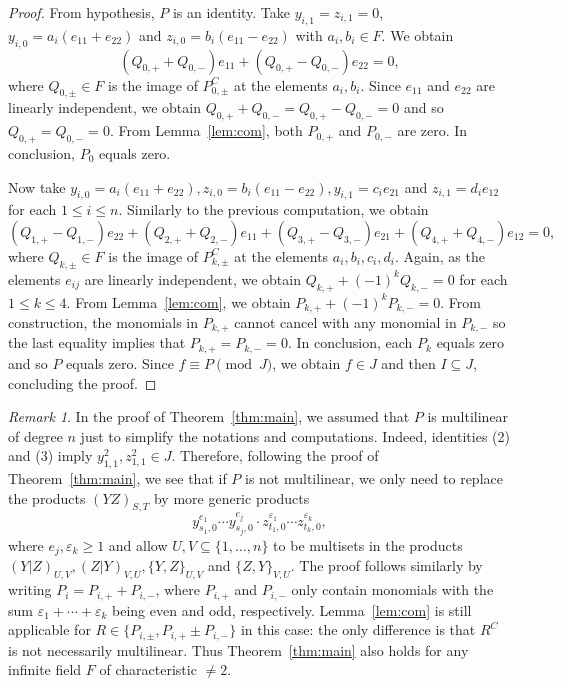 \documentclass[11pt]{amsart}
\theoremstyle{definition}
\theoremstyle{remark}
\newtheorem{remark}[theorem]{Remark}
\begin{document}
\begin{proof}
		From hypothesis, $P$ is an identity. Take $y_{i, 1}= z_{i, 1}=0$, $y_{i, 0}=a_i(e_{11}+e_{22})$ and $z_{i, 0}=b_i (e_{11}-e_{22})$ with $a_i, b_i\in F$. We obtain
		$$(Q_{0, +}+Q_{0, -})e_{1 1}+(Q_{0, +}-Q_{0, -})e_{2 2}=0,$$
		where $Q_{0, \pm}\in F$ is the image of $P_{0, \pm}^C$ at the elements $a_i, b_i$. Since $e_{11}$ and $e_{22}$ are linearly independent, we obtain $Q_{0, +}+Q_{0, -}=Q_{0, +}-Q_{0, -}=0$ and so $Q_{0, +}=Q_{0, -}=0$. From Lemma~\ref{lem:com}, both $P_{0, +}$ and $P_{0, -}$ are zero. In conclusion, $P_0$ equals zero.
		
		Now take $y_{i, 0}=a_i(e_{11}+e_{22}), z_{i, 0}=b_i(e_{11}-e_{22}), y_{i, 1}=c_i e_{21}$ and $z_{i, 1}=d_i e_{12}$ for each $1\le i\le n$.
		Similarly to the previous computation, we obtain 
		$$(Q_{1, +}-Q_{1, -})e_{22}+(Q_{2, +}+Q_{2, -})e_{11}+(Q_{3, +}-Q_{3, -})e_{21}+(Q_{4, +}+Q_{4, -}) e_{12}=0,$$
		where $Q_{k, \pm}\in F$ is the image of $P_{k, \pm}^C$ at the elements $a_i, b_i, c_i, d_i$. 
		Again, as the elements $e_{ij}$ are linearly independent, we obtain $Q_{k, +}+(-1)^kQ_{k, -}=0$ for each $1\le k\le 4$. From Lemma~\ref{lem:com}, we obtain $P_{k, +}+(-1)^kP_{k, -}=0$. From construction, the monomials in $P_{k, +}$ cannot cancel with any monomial in  $P_{k, -}$ so the last equality implies that $P_{k, +}=P_{k, -}=0$. In conclusion, each $P_k$ equals zero and so $P$ equals zero. Since $f\equiv P\pmod J$, we obtain $f\in J$ and then $I\subseteq J$, concluding the proof.
	\end{proof}
	
	
	\begin{remark}\label{rem:homo}
		In the proof of Theorem~\ref{thm:main}, we assumed that $P$ is multilinear of degree $n$ just to simplify the notations and computations. Indeed, identities (2) and (3) imply $y_{1, 1}^2, z_{1, 1}^2\in J$. Therefore, following the proof of Theorem~\ref{thm:main}, we see that if $P$ is not multilinear, we only need to replace the products
		$(YZ)_{S, T}$ by more generic products 
		$$y_{s_1, 0}^{e_1}\cdots y_{s_j, 0}^{e_j}\cdot z_{t_1, 0}^{\varepsilon_1}\cdots z_{t_k, 0}^{\varepsilon_k},$$
		where $e_j, \varepsilon_k\ge 1$ and allow $U, V\subseteq\{1, \ldots, n\}$ to be multisets in the products $(Y|Z)_{U, V}, (Z|Y)_{V, U}, \{Y, Z\}_{U, V}$ and $\{Z, Y\}_{V, U}$. The proof follows similarly by writing $P_i=P_{i, +}+P_{i, -}$, where $P_{i, +}$ and $P_{i, -}$ only contain monomials with the sum $\varepsilon_1+\cdots+\varepsilon_k$ being even and odd, respectively. Lemma~\ref{lem:com} is still applicable for $R\in \{P_{i, \pm}, P_{i, +}\pm P_{i, -}\}$ in this case:  the only difference is that $R^C$ is not necessarily multilinear.  
    Thus Theorem~\ref{thm:main} also holds for any infinite field $F$ of characteristic $\ne 2$. 
	\end{remark}
	
\end{document}
